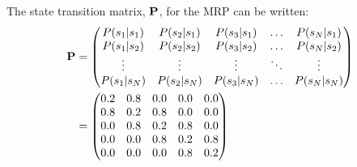 \documentclass[a4paper,11pt]{article}
\begin{document}
The state transition matrix, ${\bf P}$, for the MRP can be written:
\begin{equation} \label{eqn:state_transition_matrix_for_slippery_world}
\begin{split}
        {\bf P} &=  
        \begin{pmatrix}
        P(s_1|s_1) & P(s_2|s_1) & P(s_3|s_1) & \hdots & P(s_N|s_1) \\
        P(s_1|s_2) & P(s_2|s_2) & P(s_3|s_2) & \hdots & P(s_N|s_2) \\
        \vdots & \vdots & \vdots & \ddots & \vdots \\
        P(s_1|s_N) & P(s_2|s_N) & P(s_3|s_N) & \hdots & P(s_N|s_N)
        \end{pmatrix} \\
        &= 
        \begin{pmatrix}
        0.2 & 0.8 & 0.0 & 0.0 & 0.0 \\
        0.8 & 0.2 & 0.8 & 0.0 & 0.0 \\
        0.0 & 0.8 & 0.2 & 0.8 & 0.0 \\
        0.0 & 0.0 & 0.8 & 0.2 & 0.8 \\
        0.0 & 0.0 & 0.0 & 0.8 & 0.2 
        \end{pmatrix}
\end{split}
\end{equation}
\end{document}
